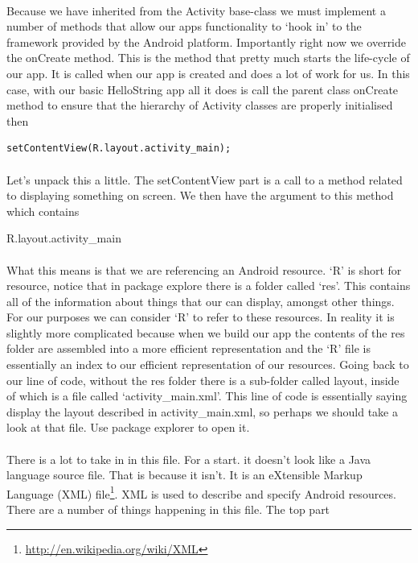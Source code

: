 \paragraph{} Because we have inherited from the Activity base-class we must implement a number of methods that allow our apps functionality to `hook in' to the framework provided by the Android platform. Importantly right now we override the onCreate method. This is the method that pretty much starts the life-cycle of our app. It is called when our app is created and does a lot of work for us. In this case, with our basic HelloString app all it does is call the parent class onCreate method to ensure that the hierarchy of Activity classes are properly initialised then

\begin{lstlisting}
setContentView(R.layout.activity_main);
\end{lstlisting}

\paragraph{} Let's unpack this a little. The setContentView part is a call to a method related to displaying something on screen. We then have the argument to this method which contains 
\begin{framed}
R.layout.activity\_main
\end{framed}
\paragraph{} What this means is that we are referencing an Android resource. `R' is short for resource, notice that in package explore there is a folder called `res'. This contains all of the information about things that our can display, amongst other things. For our purposes we can consider `R' to refer to these resources. In reality it is slightly more complicated because when we build our app the contents of the res folder are assembled into a more efficient representation and the `R' file is essentially an index to our efficient representation of our resources. Going back to our line of code, without the res folder there is a sub-folder called layout, inside of which is a file called `activity\_main.xml'. This line of code is essentially saying display the layout described in activity\_main.xml, so perhaps we should take a look at that file. Use package explorer to open it.

\paragraph{} There is a lot to take in in this file. For a start. it doesn't look like a Java language source file. That is because it isn't. It is an eXtensible Markup Language (XML) file\footnote{\url{http://en.wikipedia.org/wiki/XML}}. XML is used to describe and specify Android resources. There are a number of things happening in this file. The top part

